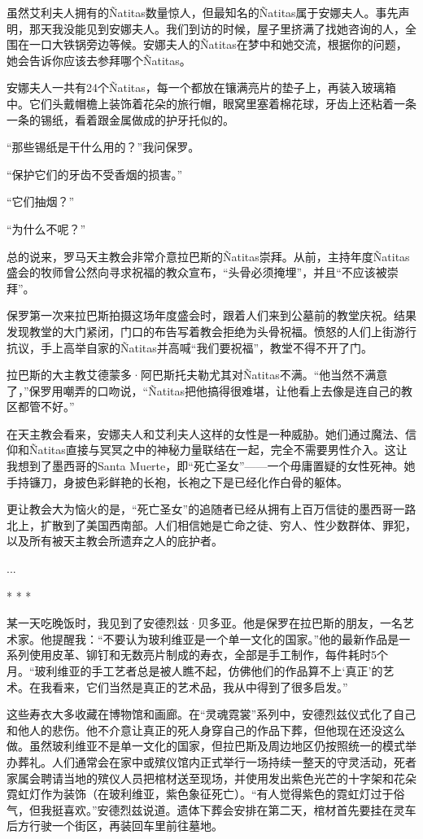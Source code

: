 \documentclass[12pt,oneside]{book}
\begin{document}
虽然艾利夫人拥有的Ñatitas数量惊人，但最知名的Ñatitas属于安娜夫人。事先声明，那天我没能见到安娜夫人。我们到访的时候，屋子里挤满了找她咨询的人，全围在一口大铁锅旁边等候。安娜夫人的Ñatitas在梦中和她交流，根据你的问题，她会告诉你应该去参拜哪个Ñatitas。

安娜夫人一共有24个Ñatitas，每一个都放在镶满亮片的垫子上，再装入玻璃箱中。它们头戴帽檐上装饰着花朵的旅行帽，眼窝里塞着棉花球，牙齿上还粘着一条一条的锡纸，看着跟金属做成的护牙托似的。

“那些锡纸是干什么用的？”我问保罗。

“保护它们的牙齿不受香烟的损害。”

“它们抽烟？”

“为什么不呢？”

总的说来，罗马天主教会非常介意拉巴斯的Ñatitas崇拜。从前，主持年度Ñatitas盛会的牧师曾公然向寻求祝福的教众宣布，“头骨必须掩埋”，并且“不应该被崇拜”。

保罗第一次来拉巴斯拍摄这场年度盛会时，跟着人们来到公墓前的教堂庆祝。结果发现教堂的大门紧闭，门口的布告写着教会拒绝为头骨祝福。愤怒的人们上街游行抗议，手上高举自家的Ñatitas并高喊“我们要祝福”，教堂不得不开了门。

拉巴斯的大主教艾德蒙多·阿巴斯托夫勒尤其对Ñatitas不满。“他当然不满意了，”保罗用嘲弄的口吻说，“Ñatitas把他搞得很难堪，让他看上去像是连自己的教区都管不好。”

在天主教会看来，安娜夫人和艾利夫人这样的女性是一种威胁。她们通过魔法、信仰和Ñatitas直接与冥冥之中的神秘力量联结在一起，完全不需要男性介入。这让我想到了墨西哥的Santa Muerte，即“死亡圣女”——一个毋庸置疑的女性死神。她手持镰刀，身披色彩鲜艳的长袍，长袍之下是已经化作白骨的躯体。

更让教会大为恼火的是，“死亡圣女”的追随者已经从拥有上百万信徒的墨西哥一路北上，扩散到了美国西南部。人们相信她是亡命之徒、穷人、性少数群体、罪犯，以及所有被天主教会所遗弃之人的庇护者。

...

\begin{center}
* * *
\end{center}

某一天吃晚饭时，我见到了安德烈兹·贝多亚。他是保罗在拉巴斯的朋友，一名艺术家。他提醒我：“不要认为玻利维亚是一个单一文化的国家。”他的最新作品是一系列使用皮革、铆钉和无数亮片制成的寿衣，全部是手工制作，每件耗时5个月。“玻利维亚的手工艺者总是被人瞧不起，仿佛他们的作品算不上‘真正’的艺术。在我看来，它们当然是真正的艺术品，我从中得到了很多启发。”

这些寿衣大多收藏在博物馆和画廊。在“灵魂霓裳”系列中，安德烈兹仪式化了自己和他人的悲伤。他不介意让真正的死人身穿自己的作品下葬，但他现在还没这么做。虽然玻利维亚不是单一文化的国家，但拉巴斯及周边地区仍按照统一的模式举办葬礼。人们通常会在家中或殡仪馆内正式举行一场持续一整天的守灵活动，死者家属会聘请当地的殡仪人员把棺材送至现场，并使用发出紫色光芒的十字架和花朵霓虹灯作为装饰（在玻利维亚，紫色象征死亡）。“有人觉得紫色的霓虹灯过于俗气，但我挺喜欢。”安德烈兹说道。遗体下葬会安排在第二天，棺材首先要挂在灵车后方行驶一个街区，再装回车里前往墓地。
\end{document}
